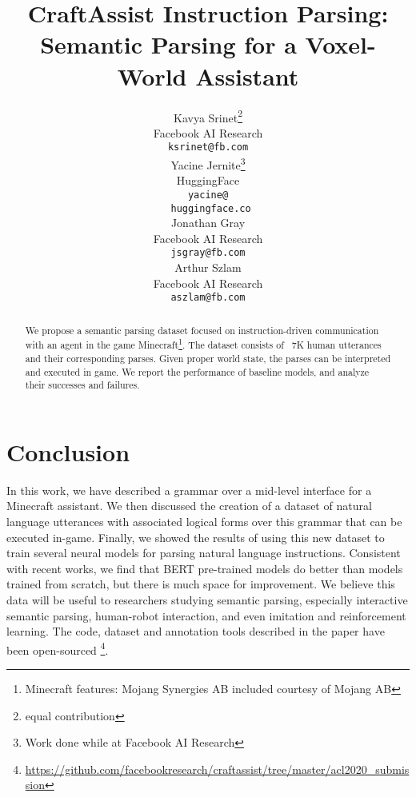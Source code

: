\documentclass[11pt,a4paper]{article}
\title{CraftAssist Instruction Parsing: Semantic Parsing for a Voxel-World Assistant}
\author{Kavya Srinet\thanks{ equal contribution} \\
  Facebook AI Research  \\
  {\texttt{ksrinet@fb.com} }\\\And
  Yacine Jernite\printfnsymbol{1}\thanks{Work done while at Facebook AI Research} \\
  HuggingFace  \\ 
  {\texttt{yacine@}}\\
  {\texttt{ huggingface.co} }\\\And
  Jonathan Gray \\
  Facebook AI Research  \\
  {\texttt{jsgray@fb.com}} \\\And
  Arthur Szlam \\
  Facebook AI Research  \\
  {\texttt{aszlam@fb.com} }\\}
\date{}
\begin{document}
\maketitle
\begin{abstract}
We propose a semantic parsing dataset focused on instruction-driven communication with an agent in the game Minecraft\footnote{Minecraft features: \textcopyright Mojang Synergies AB included courtesy of Mojang AB}.  
The dataset consists of 
 ~7K human utterances and their corresponding parses.  Given proper world state, the parses can be interpreted and executed in game. 
We report the performance of baseline models, and analyze their successes and failures.
\end{abstract}








\section{Conclusion}
In this work, we have described a grammar over a mid-level interface for a Minecraft assistant. We then discussed the creation of a dataset of natural language utterances with associated logical forms over this grammar that can be executed in-game. Finally, we showed the results of using this new dataset to train several neural models for parsing natural language instructions.  %
Consistent with recent works, we find that BERT pre-trained models do better than models trained from scratch, but there is much space for improvement.
We believe this data will be useful to researchers studying semantic parsing, especially interactive semantic parsing, human-robot interaction, and even imitation and reinforcement learning. The code, dataset and annotation tools described in the paper have been open-sourced \footnote{\url{https://github.com/facebookresearch/craftassist/tree/master/acl2020_submission}}. 
\end{document}

